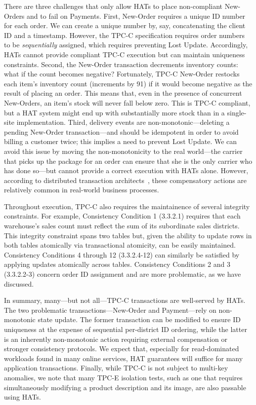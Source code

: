 There are three challenges that only allow HATs to place non-compliant
New-Orders and to fail on Payments. First, New-Order requires a unique
ID number for each order. We can create a unique number by, say,
concatenating the client ID and a timestamp. However, the TPC-C
specification requires order numbers to be \textit{sequentially}
assigned, which requires preventing Lost Update. Accordingly, HATs
cannot provide compliant TPC-C execution but can maintain uniqueness
constraints. Second, the New-Order transaction decrements inventory
counts: what if the count becomes negative? Fortunately, TPC-C
New-Order restocks each item's inventory count (increments by 91) if
it would become negative as the result of placing an order. This means
that, even in the presence of concurrent New-Orders, an item's stock
will never fall below zero. This is TPC-C compliant, but a HAT system
might end up with substantially more stock than in a single-site
implementation. Third, delivery events are non-monotonic---deleting a
pending New-Order transaction---and should be idempotent in order to
avoid billing a customer twice; this implies a need to prevent Lost
Update. We can avoid this issue by moving the non-monotonicity to the
real world---the carrier that picks up the package for an order can
ensure that she is the only carrier who has done so---but cannot
provide a correct execution with HATs alone. However, according to
distributed transaction architects~\cite{helland}, these compensatory
actions are relatively common in real-world business processes.

Throughout execution, TPC-C also requires the maintainence of several
integrity constraints. For example, Consistency Condition 1 (3.3.2.1)
requires that each warehouse's sales count must reflect the sum of its
subordinate sales districts. This integrity constraint spans two
tables but, given the ability to update rows in both tables atomically
via transactional atomicity, can be easily maintained. Consistency
Conditions 4 through 12 (3.3.2.4-12) can similarly be satisfied by
applying updates atomically across tables. Consistency Conditions 2
and 3 (3.3.2.2-3) concern order ID assignment and are more
problematic, as we have discussed.

In summary, many---but not all---TPC-C transactions are well-served by
HATs. The two problematic transactions---New-Order and Payment---rely
on non-monotonic state update. The former transaction can be modified
to ensure ID uniqueness at the expense of sequential per-district ID
ordering, while the latter is an inherently non-monotonic action
requiring external compensation or stronger consistency protocols. We
expect that, especially for read-dominated workloads found in many
online services, HAT guarantees will suffice for many application
transactions. Finally, while TPC-C is not subject to multi-key
anomalies, we note that many TPC-E isolation tests, such as one that
requires simultaneously modifying a product description and its image,
are also passable using HATs.


